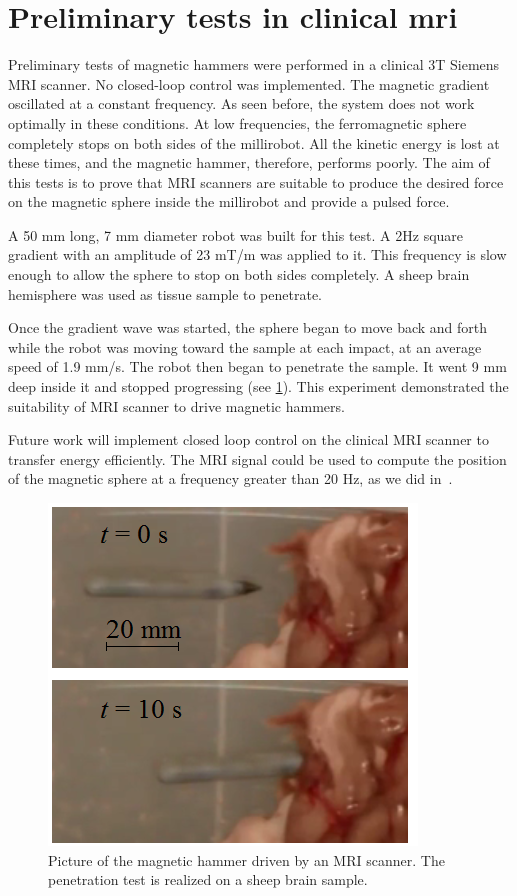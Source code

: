 \documentclass[letterpaper, 10 pt, conference]{ieeeconf}  %
\begin{document}
\section{Preliminary tests in clinical mri}
\label{MRI_tests}
Preliminary tests of magnetic hammers were performed in a clinical 3T Siemens MRI scanner. 
No closed-loop control was implemented. 
The magnetic gradient  oscillated at a constant frequency. 
As seen before, the system does not work optimally in these conditions. 
At low frequencies, the ferromagnetic sphere completely stops on both sides of the millirobot. 
All the kinetic energy is lost at these times, and the magnetic hammer, therefore, performs poorly. 
The aim of this tests is to prove that MRI scanners are suitable to produce the desired force on the magnetic sphere inside the millirobot and provide a pulsed force.\par
A 50 mm long, 7 mm diameter robot was built for this test. 
A 2Hz square gradient with an amplitude of 23 mT/m was applied to it. 
This frequency is slow enough to allow the sphere to stop on both sides completely. 
A sheep brain hemisphere was used as tissue sample to penetrate.\par
Once the gradient wave was started, the sphere began to move back and forth while the robot was moving toward the sample at each impact, at an average speed of 1.9 mm/s.
 The robot then began to penetrate the sample. It went 9 mm deep inside it and stopped progressing (see \cref{MRI_test}). 
This experiment demonstrated the suitability of MRI scanner to drive magnetic hammers. \par
Future work will implement closed loop control on the clinical MRI scanner to transfer energy efficiently. 
The MRI signal could be used to compute the position of the magnetic sphere at a frequency greater than 20 Hz, as we did in~\cite{578}.

\begin{figure}
\centering
  \includegraphics[width=150 pt]{tests_in_MRI.png}
  \caption{Picture of the magnetic hammer driven by an MRI scanner. The penetration test is realized on a sheep brain sample.}
  \label{MRI_test}
\end{figure}
\end{document}
